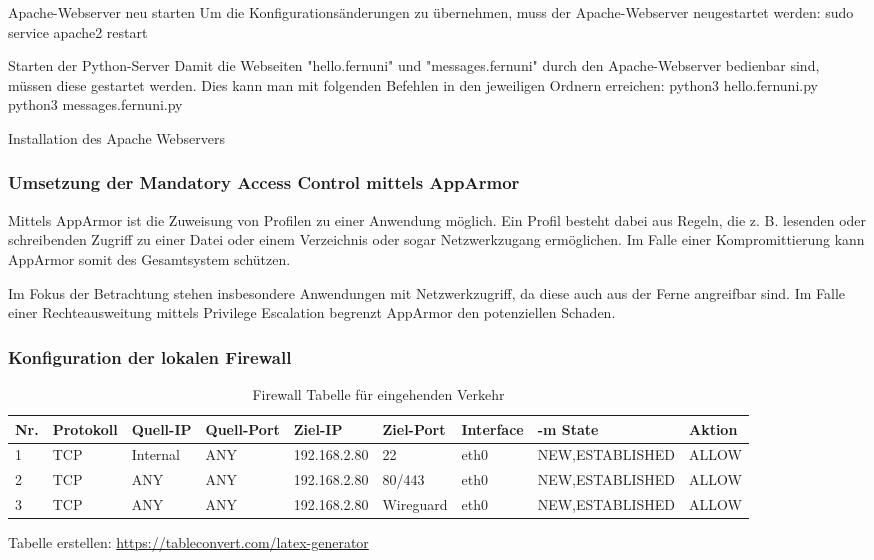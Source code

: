 Apache-Webserver neu starten
Um die Konfigurationsänderungen zu übernehmen, muss der Apache-Webserver neugestartet werden:
sudo service apache2 restart

Starten der Python-Server
Damit die Webseiten "hello.fernuni" und "messages.fernuni" durch den Apache-Webserver bedienbar sind, müssen diese gestartet werden. Dies kann man mit folgenden Befehlen in den jeweiligen Ordnern erreichen:
python3 hello.fernuni.py
python3 messages.fernuni.py


\begin{listing}[ht]{}
    \caption{Installation des Apache Webservers}
    \label{listing:installation_apache}
\end{listing}

\subsubsection{Umsetzung der Mandatory Access Control mittels AppArmor}

Mittels AppArmor ist die Zuweisung von Profilen zu einer Anwendung möglich. Ein Profil besteht dabei aus Regeln, die z. B. lesenden oder schreibenden Zugriff zu einer Datei oder einem Verzeichnis oder sogar Netzwerkzugang ermöglichen. Im Falle einer Kompromittierung kann AppArmor somit des Gesamtsystem schützen.

Im Fokus der Betrachtung stehen insbesondere Anwendungen mit Netzwerkzugriff, da diese auch aus der Ferne angreifbar sind. Im Falle einer Rechteausweitung mittels Privilege Escalation begrenzt AppArmor den potenziellen Schaden\cite{hutchinsIntelligenceDrivenComputerNetwork}.

\subsubsection{Konfiguration der lokalen Firewall}


\begin{table}[!ht]
    \centering
    \begin{adjustbox}{width=\textwidth}

    \begin{tabular}{|l|l|l|l|l|l|l|l|l|}
        \hline
            Nr. & Protokoll & Quell-IP & Quell-Port & Ziel-IP & Ziel-Port & Interface & -m State & Aktion \\ \hline
            1 & TCP & Internal & ANY & 192.168.2.80 & 22 & eth0 & NEW,ESTABLISHED & ALLOW \\ \hline
            2 & TCP & ANY & ANY & 192.168.2.80 & 80/443 & eth0 & NEW,ESTABLISHED & ALLOW \\ \hline
            3 & TCP & ANY & ANY & 192.168.2.80 & Wireguard & eth0 & NEW,ESTABLISHED & ALLOW \\ \hline
        \end{tabular}
    \end{adjustbox}
    \caption{Firewall Tabelle für eingehenden Verkehr}
    \label{regeln_fw_incoming}
\end{table}
Tabelle erstellen: \url{https://tableconvert.com/latex-generator}

